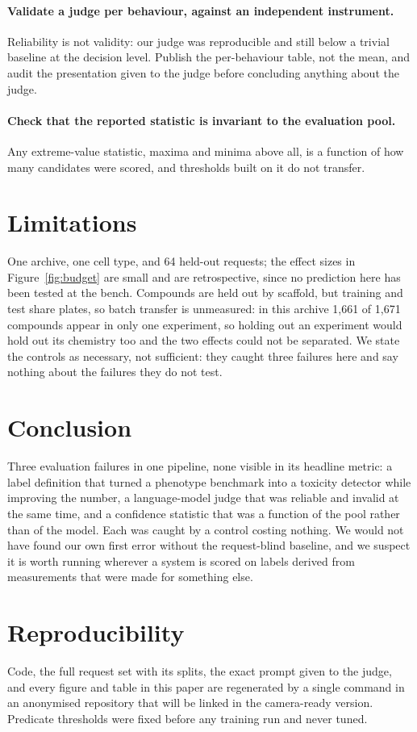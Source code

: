 \documentclass[letterpaper]{article}
\begin{document}
\paragraph{Validate a judge per behaviour, against an independent instrument.}
Reliability is not validity: our judge was reproducible and still below a trivial
baseline at the decision level. Publish the per-behaviour table, not the mean, and
audit the presentation given to the judge before concluding anything about the judge.

\paragraph{Check that the reported statistic is invariant to the evaluation pool.}
Any extreme-value statistic, maxima and minima above all, is a function of how many
candidates were scored, and thresholds built on it do not transfer.

\section{Limitations}

One archive, one cell type, and 64 held-out requests; the effect sizes in
Figure~\ref{fig:budget} are small and are retrospective, since no prediction here has
been tested at the bench. Compounds are held out by scaffold, but training and test
share plates, so batch transfer is unmeasured: in this archive 1{,}661 of 1{,}671
compounds appear in only one experiment, so holding out an experiment would hold out its
chemistry too and the two effects could not be separated. We state the controls as
necessary, not sufficient: they caught three failures here and say nothing about the
failures they do not test.

\section{Conclusion}

Three evaluation failures in one pipeline, none visible in its headline metric: a label
definition that turned a phenotype benchmark into a toxicity detector while improving
the number, a language-model judge that was reliable and invalid at the same time, and a
confidence statistic that was a function of the pool rather than of the model. Each was
caught by a control costing nothing. We would not have found our own first error without
the request-blind baseline, and we suspect it is worth running wherever a system is
scored on labels derived from measurements that were made for something else.

\section*{Reproducibility}

Code, the full request set with its splits, the exact prompt given to the judge, and
every figure and table in this paper are regenerated by a single command in an
anonymised repository that will be linked in the camera-ready version. Predicate
thresholds were fixed before any training run and never tuned.



\end{document}
